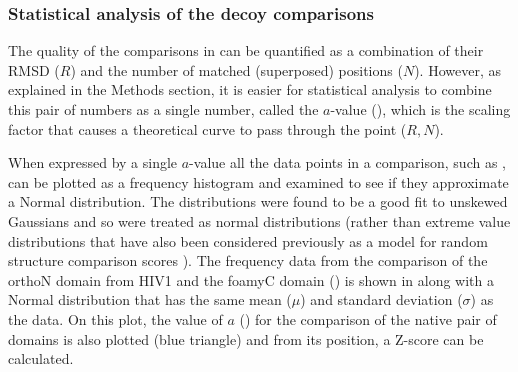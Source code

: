 %
%
%
%
%
%
%
%
%

\subsubsection{Statistical analysis of the decoy comparisons}

The quality of the comparisons in  can be quantified as a combination of their
RMSD ($R$) and the number of matched (superposed) positions ($N$).   However, as explained in 
the Methods section, it is easier for statistical analysis to combine this pair of numbers
as a single number,  called the $a$-value (), which is the scaling factor that
causes a theoretical curve to pass through the point ($R,N$).

When expressed by a single $a$-value
all the data points in a comparison, such as ,
can be plotted as a frequency histogram and examined to see if they approximate a Normal
distribution.   The distributions were found to be a good fit to unskewed Gaussians and
so were treated as normal distributions (rather than extreme value distributions
that have also been considered previously as a model for random structure comparison scores
\cite{Levitt,Taylor}).    The frequency data from the comparison of the orthoN domain from
HIV1 and the foamyC domain () is shown in  along with a Normal  
distribution that has the same mean ($\mu$) and standard deviation ($\sigma$) as the data.
On this plot, the value of $a$ () for the comparison of the
native pair of domains is also plotted (blue triangle) and from its position, a Z-score
can be calculated.

